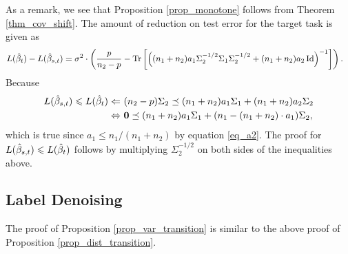 As a remark, we see that Proposition \ref{prop_monotone} follows from Theorem \ref{thm_cov_shift}.
The amount of reduction on test error for the target task is given as
	\begin{align*}
		L(\hat{\beta}_t) - L(\hat{\beta}_{s,t})
		&= \sigma^2 \cdot \left({\frac p {n_2 - p} -  \operatorname{Tr}\left[\left({(n_1 + n_2)a_1\Sigma_2^{-1/2}\Sigma_1\Sigma_2^{-1/2} + (n_1 + n_2)a_2\operatorname{Id}}\right)^{-1}\right]}\right).
	\end{align*}
Because
\begin{align*}
	L(\hat{\beta}_{s,t}) \leqslant L(\hat{\beta}_t)
	\Leftarrow~ & (n_2 - p)\Sigma_2 \preceq (n_1 + n_2) a_1 \Sigma_1 + (n_1 + n_2)a_2 \Sigma_2 \\
	\Leftrightarrow~ & \mathbf{0} \preceq (n_1 + n_2) a_1 \Sigma_1 + (n_1 - (n_1 + n_2)\cdot a_1) \Sigma_2,
\end{align*}
which is true since $a_1 \le n_1 / (n_1 + n_2)$ by equation \eqref{eq_a2}.
The proof for $L(\hat{\beta}_{s,t}) \leqslant L(\hat{\beta}_t)$ follows by multiplying $\Sigma_2^{-1/2}$ on both sides of the inequalities above.

\medskip
\fi





\iffalse
\subsection{Label Denoising}

The proof of Proposition \ref{prop_var_transition} is similar to the above proof of Proposition \ref{prop_dist_transition}.


